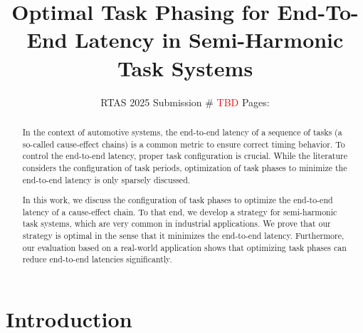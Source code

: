 \documentclass[conference]{resources/IEEEtran}
\theoremstyle{definition}
\theoremstyle{remark}
\begin{document}
	\title{Optimal Task Phasing for End-To-End Latency in Semi-Harmonic Task Systems}
	
	
	
	\author{RTAS 2025 Submission \# \textcolor{red}{TBD} \quad\quad\quad Pages: \pageref{last-page}}
	
	\maketitle

	\begin{abstract}
		In the context of automotive systems, the end-to-end latency of a sequence of tasks (a so-called cause-effect chains) is a common metric to ensure correct timing behavior.
		To control the end-to-end latency, proper task configuration is crucial. 
		While the literature considers the configuration of task periods, optimization of task phases to minimize the end-to-end latency is only sparsely discussed. 

		In this work, we discuss the configuration of task phases to optimize the end-to-end latency of a cause-effect chain.
		To that end, we develop a strategy for semi-harmonic task systems, which are very common in industrial applications.
		We prove that our strategy is optimal in the sense that it minimizes the end-to-end latency.
		Furthermore, our evaluation based on a real-world application shows that optimizing task phases can reduce end-to-end latencies significantly. 
	\end{abstract} 
	
	
	\section{Introduction}
	\label{sec:introduction}
\end{document}
